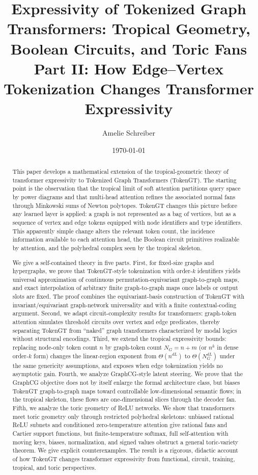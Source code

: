 \documentclass[11pt]{article}
\title{\vspace{-1em}\textbf{Expressivity of Tokenized Graph Transformers: Tropical Geometry, Boolean Circuits, and Toric Fans}\\
\large Part II: How Edge--Vertex Tokenization Changes Transformer Expressivity}
\author{Amelie Schreiber}
\date{\today}
\begin{document}
\maketitle

\begin{abstract}
This paper develops a mathematical extension of the tropical-geometric theory of transformer expressivity to Tokenized Graph Transformers (TokenGT).  The starting point is the observation that the tropical limit of soft attention partitions query space by power diagrams and that multi-head attention refines the associated normal fans through Minkowski sums of Newton polytopes.  TokenGT changes this picture before any learned layer is applied: a graph is not represented as a bag of vertices, but as a sequence of vertex and edge tokens equipped with node identifiers and type identifiers.  This apparently simple change alters the relevant token count, the incidence information available to each attention head, the Boolean circuit primitives realizable by attention, and the polyhedral complex seen by the tropical skeleton.

We give a self-contained theory in five parts.  First, for fixed-size graphs and hypergraphs, we prove that TokenGT-style tokenization with order-$k$ identifiers yields universal approximation of continuous permutation-equivariant graph-to-graph maps, and exact interpolation of arbitrary finite graph-to-graph maps once labels or output slots are fixed.  The proof combines the equivariant-basis construction of TokenGT with invariant/equivariant graph-network universality and with a finite contextual-coding argument.  Second, we adapt circuit-complexity results for transformers: graph-token attention simulates threshold circuits over vertex and edge predicates, thereby separating TokenGT from ``naked'' graph transformers characterized by modal logics without structural encodings.  Third, we extend the tropical expressivity bounds: replacing node-only token count $n$ by graph-token count $N_G=n+m$ (or $n^k$ in dense order-$k$ form) changes the linear-region exponent from $\Theta(n^{dL})$ to $\Theta(N_G^{dL})$ under the same genericity assumptions, and exposes when edge tokenization yields no asymptotic gain.  Fourth, we analyze GraphCG-style latent steering.  We prove that the GraphCG objective does not by itself enlarge the formal architecture class, but biases TokenGT graph-to-graph maps toward controllable low-dimensional semantic flows; in the tropical skeleton, these flows are one-dimensional slices through the decoder fan.  Fifth, we analyze the toric geometry of ReLU networks.  We show that transformers meet toric geometry only through restricted polyhedral skeletons: unbiased rational ReLU subnets and conditioned zero-temperature attention give rational fans and Cartier support functions, but finite-temperature softmax, full self-attention with moving keys, biases, normalization, and signed values obstruct a general toric-variety theorem.  We give explicit counterexamples.  The result is a rigorous, didactic account of how TokenGT changes transformer expressivity from functional, circuit, training, tropical, and toric perspectives.
\end{abstract}
\end{document}
